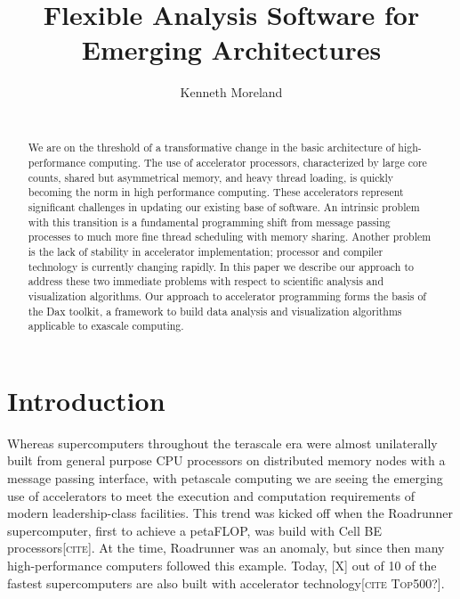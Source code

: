 \documentclass{sig-alternate}
\author{
  \alignauthor Kenneth Moreland \\
  \myaffaddr{Sandia National Laboratories} \\
  \myemail{kmorel@sandia.gov}
}
\title{Flexible Analysis Software for Emerging Architectures}
\newcommand{\fix}[1]{{\color{red}\textsc{[#1]}}}
\begin{document}
\sloppy

\maketitle

\begin{abstract}
  We are on the threshold of a transformative change in the basic
  architecture of high-performance computing.  The use of accelerator
  processors, characterized by large core counts, shared but asymmetrical
  memory, and heavy thread loading, is quickly becoming the norm in high
  performance computing.  These accelerators represent significant
  challenges in updating our existing base of software.  An intrinsic
  problem with this transition is a fundamental programming shift from
  message passing processes to much more fine thread scheduling with memory
  sharing.  Another problem is the lack of stability in accelerator
  implementation; processor and compiler technology is currently changing
  rapidly.  In this paper we describe our approach to address these two
  immediate problems with respect to scientific analysis and visualization
  algorithms.  Our approach to accelerator programming forms the basis of
  the Dax toolkit, a framework to build data analysis and visualization
  algorithms applicable to exascale computing.
\end{abstract}

\section{Introduction}
\label{sec:Introduction}

\noindent
Whereas supercomputers throughout the terascale era were almost
unilaterally built from general purpose CPU processors on distributed
memory nodes with a message passing interface, with petascale computing we
are seeing the emerging use of accelerators to meet the execution and
computation requirements of modern leadership-class facilities.  This trend
was kicked off when the Roadrunner supercomputer, first to achieve a
petaFLOP, was build with Cell BE processors\fix{cite}.  At the time,
Roadrunner was an anomaly, but since then many high-performance computers
followed this example.  Today, \fix{X} out of 10 of the fastest supercomputers
are also built with accelerator technology\fix{cite Top500?}.
\end{document}
